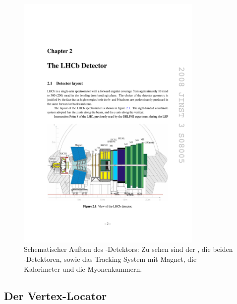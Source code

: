 \begin{figure}[htpb]
	\centering
		\includegraphics[width=0.8\textwidth]{fig/det_plot.pdf}
	\caption{Schematischer Aufbau des \lhcb-Detektors: Zu sehen sind der \velo, die beiden \rich-Detektoren, sowie das Tracking System mit Magnet, die Kalorimeter und die Myonenkammern. \cite{Alves:2008zz}}
	\label{fig:det_plot} 
\end{figure} 

\subsection{Der Vertex-Locator}\label{sec:velo}

